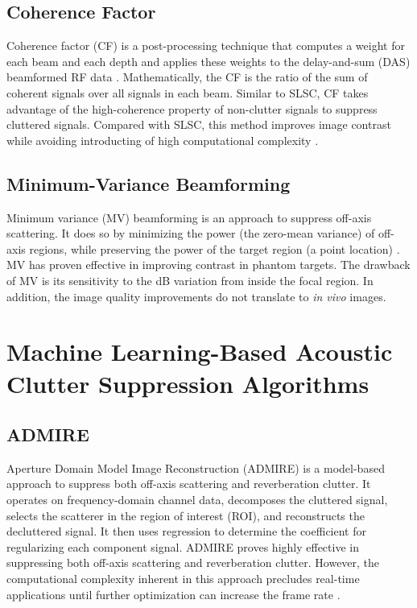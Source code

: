     \subsection{Coherence Factor}
      Coherence factor (CF) is a post-processing technique that computes a weight for each beam and each depth and applies these weights to the delay-and-sum (DAS) beamformed RF data \cite{mallart1994adaptive, hollman1999coherence}. Mathematically, the CF is the ratio of the sum of coherent signals over all signals in each beam. Similar to SLSC, CF takes advantage of the high-coherence property of non-clutter signals to suppress cluttered signals. Compared with SLSC, this method improves image contrast while avoiding introducting of high computational complexity \cite{dei_thesis}. %

    \subsection{Minimum-Variance Beamforming}
      Minimum variance (MV) beamforming is an approach to suppress off-axis scattering. It does so by minimizing the power (the zero-mean variance) of off-axis regions, while preserving the power of the target region (a point location) \cite{synnevag2007adaptive, holfort2009broadband}. MV has proven effective in improving contrast in phantom targets. The drawback of MV is its sensitivity to the dB variation from inside the focal region. In addition, the image quality improvements do not translate to \textit{in vivo} images. %

  \section{Machine Learning-Based Acoustic Clutter Suppression Algorithms}
    \subsection{ADMIRE}

      Aperture Domain Model Image Reconstruction (ADMIRE) is a model-based approach to suppress both off-axis scattering and reverberation clutter. It operates on frequency-domain channel data, decomposes the cluttered signal, selects the scatterer in the region of interest (ROI), and reconstructs the decluttered signal. It then uses regression to determine the coefficient for regularizing each component signal. ADMIRE proves highly effective in suppressing both off-axis scattering and reverberation clutter. However, the computational complexity inherent in this approach precludes real-time applications until further optimization can increase the frame rate \cite{dei_thesis, admire2015}.

